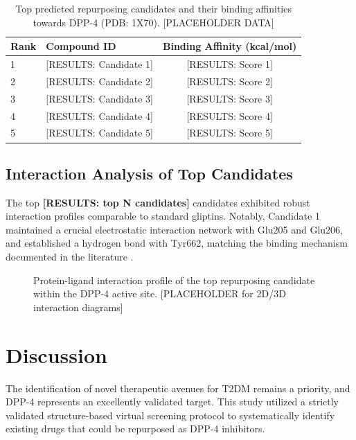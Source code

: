 \documentclass[12pt]{article}
\begin{document}
\begin{table}[H]
    \centering
    \caption{Top predicted repurposing candidates and their binding affinities towards DPP-4 (PDB: 1X70). [PLACEHOLDER DATA]}
    \begin{tabular}{llc}
        \toprule
        \textbf{Rank} & \textbf{Compound ID} & \textbf{Binding Affinity (kcal/mol)} \\
        \midrule
        1 & [RESULTS: Candidate 1] & [RESULTS: Score 1] \\
        2 & [RESULTS: Candidate 2] & [RESULTS: Score 2] \\
        3 & [RESULTS: Candidate 3] & [RESULTS: Score 3] \\
        4 & [RESULTS: Candidate 4] & [RESULTS: Score 4] \\
        5 & [RESULTS: Candidate 5] & [RESULTS: Score 5] \\
        \bottomrule
    \end{tabular}
    \label{tab:docking_results}
\end{table}

\subsection{Interaction Analysis of Top Candidates}
The top \textbf{[RESULTS: top N candidates]} candidates exhibited robust interaction profiles comparable to standard gliptins. Notably, Candidate 1 maintained a crucial electrostatic interaction network with Glu205 and Glu206, and established a hydrogen bond with Tyr662, matching the binding mechanism documented in the literature \citep{Nabeno2013, Berger2018}.

\begin{figure}[H]
    \centering
    \caption{Protein-ligand interaction profile of the top repurposing candidate within the DPP-4 active site. [PLACEHOLDER for 2D/3D interaction diagrams]}
    \label{fig:interactions}
\end{figure}

\section{Discussion}
The identification of novel therapeutic avenues for T2DM remains a priority, and DPP-4 represents an excellently validated target. This study utilized a strictly validated structure-based virtual screening protocol to systematically identify existing drugs that could be repurposed as DPP-4 inhibitors. 
\end{document}

